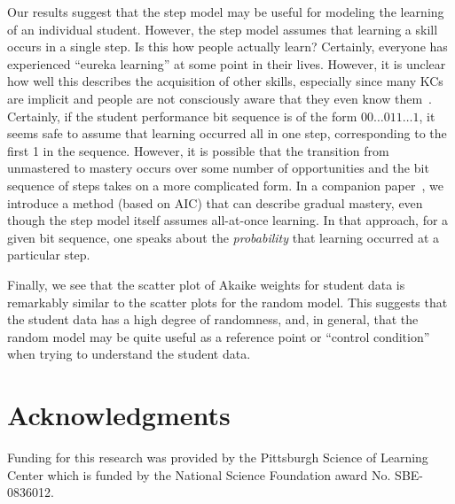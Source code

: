 \documentclass{edm_template}
\begin{document}
Our results suggest that the step model may be useful
for modeling the learning of an individual student.
However, the step model assumes that learning a skill occurs
in a single step.  Is this how people actually learn?  Certainly, everyone
has experienced  ``eureka learning'' at some point in their lives.  However,
it is unclear how well this describes the acquisition of other skills, 
especially since many KCs are implicit and people are not consciously
aware that they even know
them~\cite{koedinger_knowledge-learning-instruction_2012}. 
Certainly, if the student performance bit sequence is of the 
form $00\ldots 0 1 1 \ldots 1$, it seems safe to assume
that learning occurred all in one step, corresponding to the first
1 in the sequence.  However, it is possible that the transition
from unmastered to mastery occurs over some number of 
opportunities and the bit sequence of steps takes on a more
complicated form. 
In a companion paper~\cite{van_de_sande_measuring_2013}, we introduce
a method (based on AIC) that can describe gradual mastery, 
even though the step model itself assumes all-at-once learning.
In that approach, for a given bit sequence, one speaks about the {\em
  probability} that learning occurred at a particular step. 


Finally, we see that the scatter plot of Akaike weights for student
data is remarkably similar to the scatter plots for the random model.
This suggests that the student data has a high degree of randomness,
and, in general, that the random model may be quite useful as a
reference point or ``control condition'' when trying to understand the student data.

\section{Acknowledgments}

Funding for this research was provided by the Pittsburgh Science of
Learning Center which is funded by the National Science Foundation
award No. SBE-0836012. 


%
%

\end{document}

